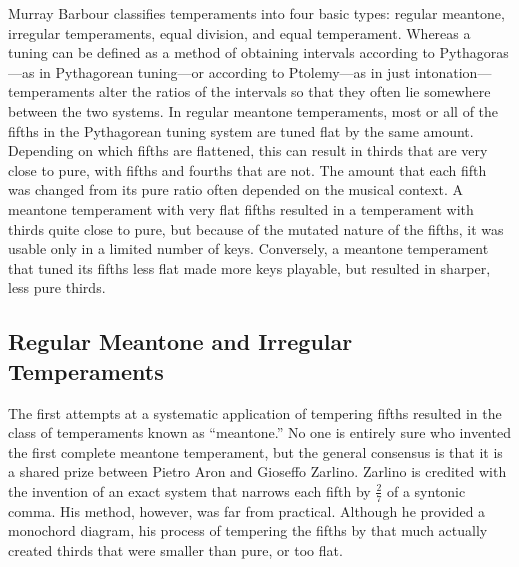 Murray Barbour classifies temperaments into four basic types: regular meantone, irregular temperaments, equal division,
and equal temperament. Whereas a tuning can be defined as a method of obtaining intervals according to Pythagoras---as
in Pythagorean tuning---or according to Ptolemy---as in just intonation---temperaments alter the ratios of the intervals
so that they often lie somewhere between the two systems. In regular meantone temperaments, most or all of the fifths in
the Pythagorean tuning system are tuned flat by the same amount. Depending on which fifths are flattened, this can
result in thirds that are very close to pure, with fifths and fourths that are not. The amount that each fifth was
changed from its pure ratio often depended on the musical context. A meantone temperament with very flat fifths
resulted in a temperament with thirds quite close to pure, but because of the mutated nature of the fifths, it was
usable only in a limited number of keys. Conversely, a meantone temperament that tuned its fifths less flat made more
keys playable, but resulted in sharper, less pure thirds.

\subsection{Regular Meantone and Irregular Temperaments}

The first attempts at a systematic application of tempering fifths resulted in the class of temperaments known as
``meantone.'' No one is entirely sure who invented the first complete meantone temperament, but the general consensus
is that it is a shared prize between Pietro Aron and Gioseffo Zarlino. Zarlino is credited with the invention of an
exact system that narrows each fifth by $\frac{2}{7}$ of a syntonic comma. His method, however, was far from practical.
Although he provided a monochord diagram, his process of tempering the fifths by that much actually created thirds that
were smaller than pure, or too flat.

